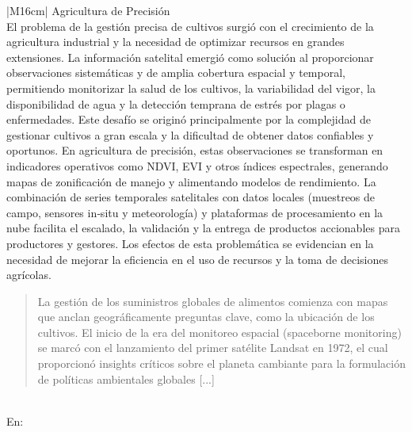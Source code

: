 \begin{table}[h!]
  \centering
  \renewcommand{\arraystretch}{2} %
  \begin{tabular}{|M{16cm}|}
    \hline
    Agricultura de Precisión \\
    \hline
    El problema de la gestión precisa de cultivos surgió con el crecimiento de la agricultura industrial y la necesidad de optimizar recursos en grandes extensiones. La información satelital emergió como solución al proporcionar observaciones sistemáticas y de amplia cobertura espacial y temporal, permitiendo monitorizar la salud de los cultivos, la variabilidad del vigor, la disponibilidad de agua y la detección temprana de estrés por plagas o enfermedades. Este desafío se originó principalmente por la complejidad de gestionar cultivos a gran escala y la dificultad de obtener datos confiables y oportunos. En agricultura de precisión, estas observaciones se transforman en indicadores operativos como NDVI, EVI y otros índices espectrales, generando mapas de zonificación de manejo y alimentando modelos de rendimiento. La combinación de series temporales satelitales con datos locales (muestreos de campo, sensores in‑situ y meteorología) y plataformas de procesamiento en la nube facilita el escalado, la validación y la entrega de productos accionables para productores y gestores. Los efectos de esta problemática se evidencian en la necesidad de mejorar la eficiencia en el uso de recursos y la toma de decisiones agrícolas. \begin{quote}
      La gestión de los suministros globales de alimentos comienza con mapas que anclan geográficamente preguntas clave, como la ubicación de los cultivos. El inicio de la era del monitoreo espacial (spaceborne monitoring) se marcó con el lanzamiento del primer satélite Landsat en 1972, el cual proporcionó insights críticos sobre el planeta cambiante para la formulación de políticas ambientales globales [...]
      \end{quote} \\
    \hline
    En: \cite{Brown2025} \\
    \hline
  \end{tabular}
  \label{tab:Contexto}
\end{table}

\newpage

